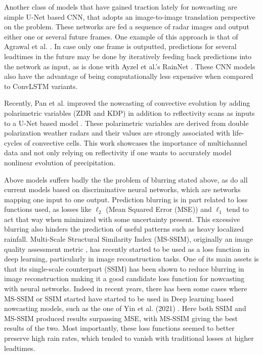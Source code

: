 Another class of models that have gained traction lately for nowcasting are simple U-Net based CNN, that adopts an image-to-image translation perspective on the problem. These networks are fed a sequence of radar images and output either one or several future frames. One example of this approach is  that of Agrawal et al. \cite{agrawal_machine_2019}. In case only one frame is outputted, predictions for several leadtimes in the future may be done by iteratively feeding back predictions into the network as input, as is done with Ayzel et al.'s RainNet \cite{ayzel_rainnet_nodate}. These CNN models also have the advantage of being computationally less expensive when compared to ConvLSTM variants. 

Recently, Pan et al. improved the nowcasting of convective evolution by adding  polarimetric variables (ZDR and KDP) in addition to reflectivity scans as inputs to a U-Net based model \cite{pan_improving_2021}. These polarimetric variables are derived from double polarization weather radars and their values are strongly associated with life-cycles of convective cells. This work showcases the importance of multichannel data and not only relying on reflectivity if one wants to accurately model nonlinear evolution of precipitation.

Above models suffers badly the the problem of blurring stated above, as do all current models based on discriminative neural networks, which are networks mapping one input to one output. Prediction blurring is in part related to loss functions used, as losses like $\ell_2$ (Mean Squared Error (MSE)) and $\ell_1$ tend to act that way when minimized with some uncertainty present. This excessive blurring also hinders the prediction of useful patterns such as heavy localized rainfall.
Multi-Scale Structural Similarity Index (MS-SSIM), originally an image quality assessment metric \cite{wang_multiscale_2003}, has recently started to be used as a loss function in deep learning, particularly in image reconstruction tasks. One of its main assets is that its single-scale counterpart (SSIM) has been shown to reduce blurring in image reconstruction \cite{zhao_loss_2017} making it a good candidate loss function for nowcasting with neural networks.  Indeed in recent years, there has been some cases where MS-SSIM or SSIM started have started to be used in Deep learning based nowcasting models, such as the one of Yin et al. (2021) \cite{yin_application_2021}. Here both SSIM and MS-SSIM produced results surpassing MSE, with MS-SSIM giving the best results of the two. Most importantly, these loss functions seemed to better preserve high rain rates, which tended to vanish with traditional losses at higher leadtimes. 

